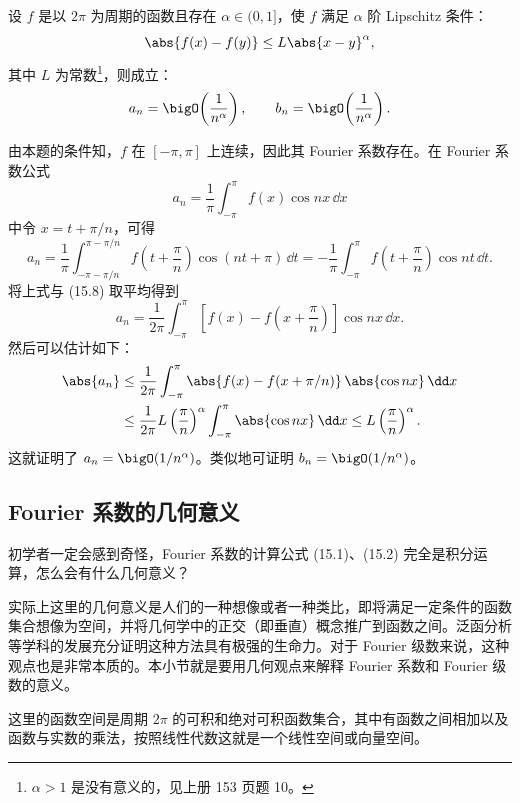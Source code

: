 \begin{xproposition}[15.1.5]
设 $f$ 是以 $2\pi$ 为周期的函数且存在 $\alpha\in(0,1]$，使 $f$ 满足 $\alpha$ 阶 Lipschitz 条件：
\[
  \abs{f(x)-f(y)}\le L\abs{x-y}^{\alpha},
\]
其中 $L$ 为常数\footnote{$\alpha>1$ 是没有意义的，见上册 153 页题 10。}，则成立：
\[
  a_n=\bigO\!\left(\frac1{n^{\alpha}}\right),\qquad
  b_n=\bigO\!\left(\frac1{n^{\alpha}}\right).
\]
\end{xproposition}

\begin{xproof}
由本题的条件知，$f$ 在 $[-\pi,\pi]$ 上连续，因此其 Fourier 系数存在。在 Fourier 系数公式
\begin{equation}
  a_n=\frac1\pi\int_{-\pi}^{\pi}f(x)\cos nx\,\dd x
  \tag{15.8}
  \label{eq:15.8}
\end{equation}
中令 $x=t+\pi/n$，可得
\[
  a_n=\frac1\pi\int_{-\pi-\pi/n}^{\pi-\pi/n}f\left(t+\frac\pi n\right)\cos(nt+\pi)\,\dd t
  =-\frac1\pi\int_{-\pi}^{\pi}f\left(t+\frac\pi n\right)\cos nt\,\dd t.
\]
将上式与 (15.8) 取平均得到
\[
  a_n=\frac1{2\pi}\int_{-\pi}^{\pi}\left[f(x)-f\left(x+\frac\pi n\right)\right]\cos nx\,\dd x.
\]
然后可以估计如下：
\begin{align*}
  \abs{a_n}
  &\le \frac1{2\pi}\int_{-\pi}^{\pi}\abs{f(x)-f(x+\pi/n)}\,\abs{\cos nx}\,\dd x\\
  &\le \frac1{2\pi}L\left(\frac\pi n\right)^{\alpha}\int_{-\pi}^{\pi}\abs{\cos nx}\,\dd x
  \le L\left(\frac\pi n\right)^{\alpha}.
\end{align*}
这就证明了 $a_n=\bigO(1/n^{\alpha})$。类似地可证明 $b_n=\bigO(1/n^{\alpha})$。
\end{xproof}

\subsection{Fourier 系数的几何意义}

初学者一定会感到奇怪，Fourier 系数的计算公式 (15.1)、(15.2) 完全是积分运算，怎么会有什么几何意义？

实际上这里的几何意义是人们的一种想像或者一种类比，即将满足一定条件的函数集合想像为空间，并将几何学中的正交（即垂直）概念推广到函数之间。泛函分析等学科的发展充分证明这种方法具有极强的生命力。对于 Fourier 级数来说，这种观点也是非常本质的。本小节就是要用几何观点来解释 Fourier 系数和 Fourier 级数的意义。

这里的函数空间是周期 $2\pi$ 的可积和绝对可积函数集合，其中有函数之间相加以及函数与实数的乘法，按照线性代数这就是一个线性空间或向量空间。

